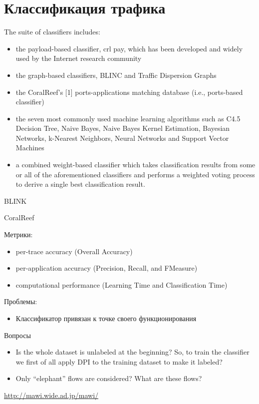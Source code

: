 \chapter{Классификация трафика}
The suite of classifiers includes:
\begin{itemize}
	\item the payload-based classifier, crl pay, which has been developed and widely
	used by the Internet research community
	\item the graph-based classifiers, BLINC and Traffic Dispersion Graphs
	\item the CoralReef’s [1] ports-applications matching database (i.e., ports-based classifier)
	\item the seven most commonly used machine learning algorithms such as C4.5 Decision Tree, Naive Bayes, Naive Bayes Kernel Estimation,
	Bayesian Networks, k-Nearest Neighbors, Neural Networks and Support Vector Machines
	\item a combined weight-based classifier which takes classification results from some or all of the aforementioned classifiers and performs a
	weighted voting process to derive a single best classification result.
\end{itemize}

BLINK

CoralReef

Метрики:
\begin{itemize}
	\item per-trace accuracy (Overall Accuracy)
	\item per-application accuracy (Precision, Recall, and FMeasure)
	\item computational performance (Learning Time
	and Classification Time)
\end{itemize}

Проблемы:
\begin{itemize}
	\item Классификатор привязан к точке своего функционирования
\end{itemize}

Вопросы
\begin{itemize}
	\item Is the whole dataset is unlabeled at the beginning? So, to train the classifier we first of all apply DPI to the training dataset to make it labeled?
	\item Only ``elephant'' flows are considered? What are these flows?
\end{itemize}

\url{http://mawi.wide.ad.jp/mawi/}
